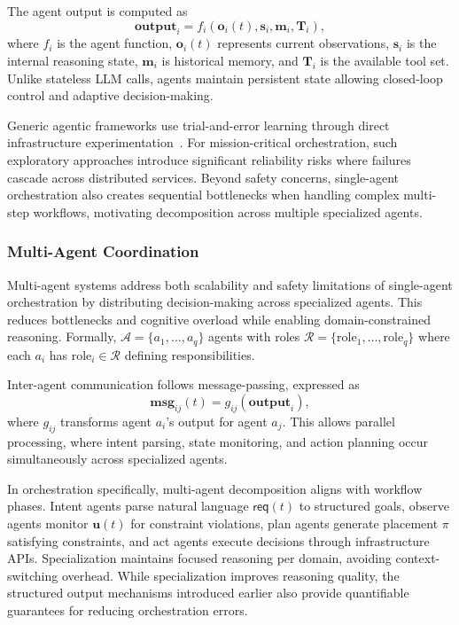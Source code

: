 The agent output is computed as
\begin{equation}
\mathbf{output}_i = f_i(\mathbf{o}_i(t), \mathbf{s}_i, \mathbf{m}_i, \mathbf{T}_i),
\end{equation}
where $f_i$ is the agent function, $\mathbf{o}_i(t)$ represents current observations, $\mathbf{s}_i$ is the internal reasoning state, $\mathbf{m}_i$ is historical memory, and $\mathbf{T}_i$ is the available tool set. Unlike stateless \ac{LLM} calls, agents maintain persistent state allowing closed-loop control and adaptive decision-making.

Generic agentic frameworks use trial-and-error learning through direct infrastructure experimentation~\cite{yao2023react}. For mission-critical orchestration, such exploratory approaches introduce significant reliability risks where failures cascade across distributed services. Beyond safety concerns, single-agent orchestration also creates sequential bottlenecks when handling complex multi-step workflows, motivating decomposition across multiple specialized agents.

\subsubsection{Multi-Agent Coordination}

Multi-agent systems address both scalability and safety limitations of single-agent orchestration by distributing decision-making across specialized agents. This reduces bottlenecks and cognitive overload while enabling domain-constrained reasoning. Formally, $\mathcal{A} = \{a_1, \ldots, a_q\}$ agents with roles $\mathcal{R} = \{\text{role}_1, \ldots, \text{role}_q\}$ where each $a_i$ has $\text{role}_i \in \mathcal{R}$ defining responsibilities.

Inter-agent communication follows message-passing, expressed as
\begin{equation}
\mathbf{msg}_{ij}(t) = g_{ij}(\mathbf{output}_i),
\end{equation}
where $g_{ij}$ transforms agent $a_i$'s output for agent $a_j$. This allows parallel processing, where intent parsing, state monitoring, and action planning occur simultaneously across specialized agents.

In orchestration specifically, multi-agent decomposition aligns with workflow phases. Intent agents parse natural language $\mathsf{req}(t)$ to structured goals, observe agents monitor $\mathbf{u}(t)$ for constraint violations, plan agents generate placement $\pi$ satisfying constraints, and act agents execute decisions through infrastructure APIs. Specialization maintains focused reasoning per domain, avoiding context-switching overhead. While specialization improves reasoning quality, the structured output mechanisms introduced earlier also provide quantifiable guarantees for reducing orchestration errors.

